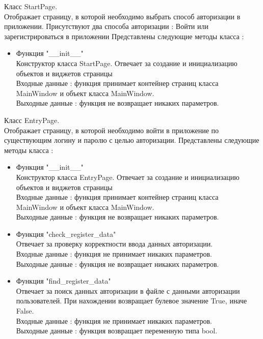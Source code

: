 \documentclass[a4document]{article}
\begin{document}
{\begin{itemize}
        Класс StartPage.\\
        Отображает страницу, в которой необходимо выбрать способ авторизации в приложении.
        Присутствуют два способа авторизации : Войти или зарегистрироваться в приложении
        Представлены следующие методы класса : 
        \begin{itemize}
            \item Функция "\_\_init\_\_" \\
                Конструктор класса StartPage. Отвечает за создание и инициализацию объектов и виджетов страницы \\
                Входные данные : функция принимает контейнер страниц класса \\MainWindow и объект класса MainWindow.\\
                Выходные данные : функция не возвращает никаких параметров.
        \end{itemize}
        \bigbreak
        
        Класс EntryPage.\\
        Отображает страницу, в которой необходимо войти в приложение по существующим логину и паролю с целью авторизации.
        Представлены следующие методы класса : 
        \begin{itemize}
            \item Функция "\_\_init\_\_" \\
                Конструктор класса EntryPage. Отвечает за создание и инициализацию объектов и виджетов страницы \\
                Входные данные : функция принимает контейнер страниц класса \\MainWindow и объект класса MainWindow.\\
                Выходные данные : функция не возвращает никаких параметров.
            \newpage
            \item Функция "check\_register\_data" \\
                Отвечает за проверку корректности ввода данных авторизации.\\
                Входные данные : функция не принимает никаких параметров.\\
                Выходные данные : функция не возвращает никаких параметров.
            \item Функция "find\_register\_data" \\
                Отвечает за поиск данных авторизации в файле с данными авторизации пользователей.
                При нахождении возвращает булевое значение True, иначе False.\\
                Входные данные : функция не принимает никаких параметров.\\
                Выходные данные : функция возвращает переменную типа bool.
        \end{itemize}
        \bigbreak
        

\end{itemize}}
\end{document}
